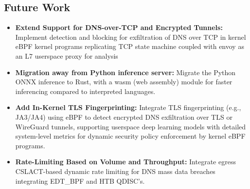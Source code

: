 \documentclass [11pt, proquest] {uwthesis}[2020/02/24]
\begin{document}
\subsection*{Future Work}

\begin{itemize}[itemsep=1pt,parsep=0pt]
  \item \textbf{Extend Support for DNS-over-TCP and Encrypted Tunnels:} Implement detection and blocking for exfiltration of DNS over TCP in kernel eBPF kernel programs replicating TCP state machine coupled with envoy as an L7 userspace proxy for analysis

  \item \textbf{Migration away from Python inference server:} Migrate the Python ONNX inference to Rust, with a wasm (web assembly) module for faster inferencing compared to interpreted languages.

  \item \textbf{Add In-Kernel TLS Fingerprinting:} Integrate TLS fingerprinting (e.g., JA3/JA4) using eBPF to detect encrypted DNS exfiltration over TLS or WireGuard tunnels, supporting userspace deep learning models with detailed system-level metrics for dynamic security policy enforcement by kernel eBPF programs.




  \item \textbf{Rate-Limiting Based on Volume and Throughput:} Integrate egress CSLACT-based dynamic rate limiting for DNS mass data breaches integrating EDT\_BPF and HTB QDISC's.


\end{itemize}
\end{document}
